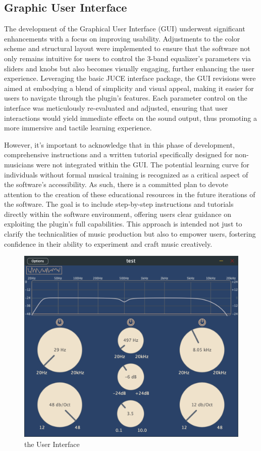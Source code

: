 \documentclass[10pt,twocolumn]{article}
\begin{document}
\subsection{Graphic User Interface}
The development of the Graphical User Interface (GUI) underwent significant enhancements with a focus on improving usability. Adjustments to the color scheme and structural layout were implemented to ensure that the software not only remains intuitive for users to control the 3-band equalizer's parameters via sliders and knobs but also becomes visually engaging, further enhancing the user experience. Leveraging the basic JUCE interface package, the GUI revisions were aimed at embodying a blend of simplicity and visual appeal, making it easier for users to navigate through the plugin's features. Each parameter control on the interface was meticulously re-evaluated and adjusted, ensuring that user interactions would yield immediate  effects on the sound output, thus promoting a more immersive and tactile learning experience.

However, it's important to acknowledge that in this phase of development, comprehensive instructions and a written tutorial specifically designed for non-musicians were not integrated within the GUI. The potential learning curve for individuals without formal musical training is recognized as a critical aspect of the software's accessibility. As such, there is a committed plan to devote attention to the creation of these educational resources in the future iterations of the software. The goal is to include step-by-step instructions and tutorials directly within the software environment, offering users clear guidance on exploiting the plugin's full capabilities. This approach is intended not just to clarify the technicalities of music production but also to empower users, fostering confidence in their ability to experiment and craft music creatively. 


\begin{figure}
    \centering
    \includegraphics[width=.95\linewidth]{GUI.png}
    \caption{
        the User Interface
    }
    \label{fig:first-page}
\end{figure}
\end{document}
